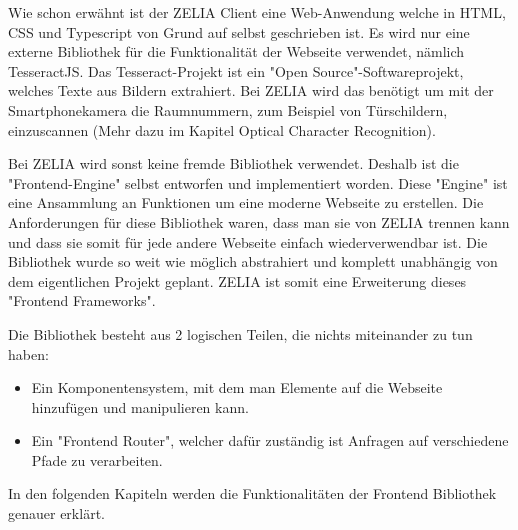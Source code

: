 
Wie schon erwähnt ist der ZELIA Client eine Web-Anwendung welche in HTML, CSS und Typescript von Grund auf selbst geschrieben ist. Es wird nur eine externe Bibliothek für die Funktionalität der Webseite verwendet, nämlich TesseractJS. Das Tesseract-Projekt ist ein "Open Source"-Softwareprojekt, welches Texte aus Bildern extrahiert. Bei ZELIA wird das benötigt um mit der Smartphonekamera die Raumnummern, zum Beispiel von Türschildern, einzuscannen (Mehr dazu im Kapitel Optical Character Recognition).

Bei ZELIA wird sonst keine fremde Bibliothek verwendet. Deshalb ist die "Frontend-Engine" selbst entworfen und implementiert worden. Diese "Engine" ist eine Ansammlung an Funktionen um eine moderne Webseite zu erstellen. Die Anforderungen für diese Bibliothek waren, dass man sie von ZELIA trennen kann und dass sie somit für jede andere Webseite einfach wiederverwendbar ist. Die Bibliothek wurde so weit wie möglich abstrahiert und komplett unabhängig von dem eigentlichen Projekt geplant. ZELIA ist somit eine Erweiterung dieses "Frontend Frameworks".

Die Bibliothek besteht aus 2 logischen Teilen, die nichts miteinander zu tun haben:
\begin{itemize}
    \item Ein Komponentensystem, mit dem man Elemente auf die Webseite hinzufügen und manipulieren kann. 
    \item Ein "Frontend Router", welcher dafür zuständig ist Anfragen auf verschiedene Pfade zu verarbeiten.
\end{itemize}

In den folgenden Kapiteln werden die Funktionalitäten der Frontend Bibliothek genauer erklärt.